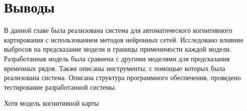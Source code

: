 \section{Выводы}

В данной главе была реализована система для автоматического когнитивного картирования с использованием
методов нейронных сетей. Исследовано влияние выбросов на предсказание модели и границы применимости каждой модели.
Разработанная модель была сравнена с другими моделями для предсказания временных рядов.
Также описаны инструменты, с помощью которых была реализована система.
Описана структура программного обеспечения, проведено тестирование разработанной системы.

Хотя модель когнитивной карты 

